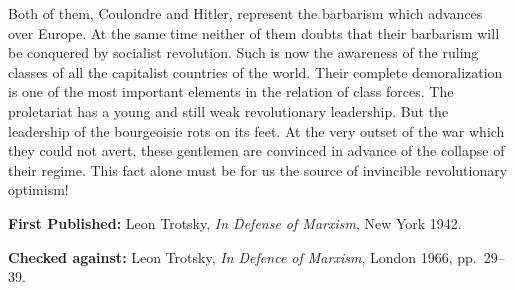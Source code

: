 Both of them, Coulondre and Hitler, represent the barbarism which advances over Europe. At the same time neither of them doubts that their barbarism will be conquered by socialist revolution. Such is now the awareness of the ruling classes of all the capitalist countries of the world. Their complete demoralization is one of the most important elements in the relation of class forces. The proletariat has a young and still weak revolutionary leadership. But the leadership of the bourgeoisie rots on its feet. At the very outset of the war which they could not avert, these gentlemen are convinced in advance of the collapse of their regime. This fact alone must be for us the source of invincible revolutionary optimism!

\begin{letterinfo}
  \textbf{First Published:} Leon Trotsky, \emph{In Defense of Marxism}, New York 1942.
  
  \textbf{Checked against:} Leon Trotsky, \emph{In Defence of Marxism}, London 1966, pp.~29--39.
\end{letterinfo}